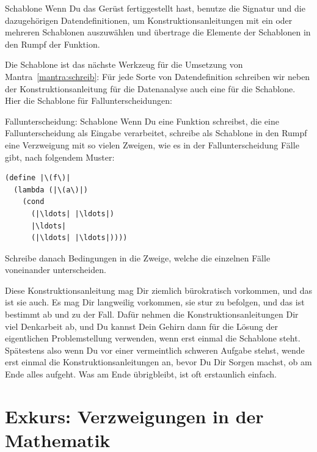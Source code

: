 \begin{konstruktionsanleitung}{Schablone}
  Wenn Du das Gerüst fertiggestellt hast, benutze die Signatur und die
  dazugehörigen Datendefinitionen, um Konstruktionsanleitungen mit ein
  oder mehreren Schablonen auszuwählen und übertrage die Elemente der
  Schablonen in den Rumpf der Funktion.
\end{konstruktionsanleitung}
%
Die Schablone ist das nächste Werkzeug für die Umsetzung von
Mantra~\ref{mantra:schreib}:
%
\mantraschreib*
%
\noindent Für jede Sorte von Datendefinition schreiben wir neben der
Konstruktionsanleitung für die Datenanalyse auch eine für die
Schablone.  Hier die Schablone für Fallunterscheidungen:
%
\begin{konstruktionsanleitung}{Fallunterscheidung: Schablone}
  \label{ka:fallunterscheidung-schablone}
  Wenn Du eine Funktion schreibst, die eine Fallunterscheidung als
  Eingabe verarbeitet, schreibe als Schablone in den Rumpf eine
  Verzweigung mit so vielen Zweigen, wie es in der Fallunterscheidung
  Fälle gibt, nach folgendem Muster:
\begin{lstlisting}
(define |\(f\)|
  (lambda (|\(a\)|)
    (cond
      (|\ldots| |\ldots|)
      |\ldots|
      (|\ldots| |\ldots|))))
\end{lstlisting}
  Schreibe danach Bedingungen in die Zweige, welche die einzelnen
  Fälle voneinander unterscheiden.
\end{konstruktionsanleitung}
%
Diese Konstruktionsanleitung mag Dir ziemlich bürokratisch vorkommen,
und das ist sie auch.  Es mag Dir langweilig vorkommen, sie stur zu
befolgen, und das ist bestimmt ab und zu der Fall.  Dafür nehmen die
Konstruktionsanleitungen Dir viel Denkarbeit ab, und Du kannst Dein
Gehirn dann für die Lösung der eigentlichen Problemstellung verwenden,
wenn erst einmal die Schablone steht.  Spätestens also wenn Du vor
einer vermeintlich schweren Aufgabe stehst, wende erst einmal die
Konstruktionsanleitungen an, bevor Du Dir Sorgen machst, ob am Ende
alles aufgeht.  Was am Ende übrigbleibt, ist oft erstaunlich einfach.

\section{Exkurs: Verzweigungen in der Mathematik}

